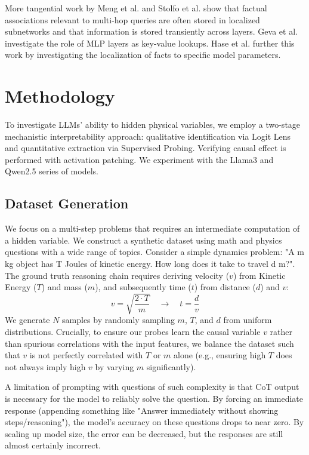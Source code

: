 \documentclass[11pt]{article}
\begin{document}
More tangential work by Meng et al. \cite{meng2022locating} and Stolfo et al. \cite{stolfo2023mechanistic} show that factual associations relevant to multi-hop queries are often stored in localized subnetworks and that information is stored transiently across layers. Geva et al. \cite{geva2021transformer} investigate the role of MLP layers as key-value lookups. Hase et al. \cite{hase2023does} further this work by investigating the localization of facts to specific model parameters. 

\section{Methodology}

To investigate LLMs' ability to hidden physical variables, we employ a two-stage mechanistic interpretability approach: qualitative identification via Logit Lens and quantitative extraction via Supervised Probing. Verifying causal effect is performed with activation patching. We experiment with the Llama3 and Qwen2.5 series of models. 

\subsection{Dataset Generation}
We focus on a multi-step problems that requires an intermediate computation of a hidden variable. We construct a synthetic dataset using math and physics questions with a wide range of topics. Consider a simple dynamics problem: "A {m} kg object has {T} Joules of kinetic energy. How long does it take to travel {d} m?". The ground truth reasoning chain requires deriving velocity ($v$) from Kinetic Energy ($T$) and mass ($m$), and subsequently time ($t$) from distance ($d$) and $v$:$$v = \sqrt{\frac{2 \cdot T}{m}} \quad \xrightarrow{} \quad t = \frac{d}{v}$$We generate $N$ samples by randomly sampling $m$, $T$, and $d$ from uniform distributions. Crucially, to ensure our probes learn the causal variable $v$ rather than spurious correlations with the input features, we balance the dataset such that $v$ is not perfectly correlated with $T$ or $m$ alone (e.g., ensuring high $T$ does not always imply high $v$ by varying $m$ significantly).

A limitation of prompting with questions of such complexity is that CoT output is necessary for the model to reliably solve the question. By forcing an immediate response (appending something like "Answer immediately without showing steps/reasoning"), the model's accuracy on these questions drops to near zero. By scaling up model size, the error can be decreased, but the responses are still almost certainly incorrect. 
\end{document}
